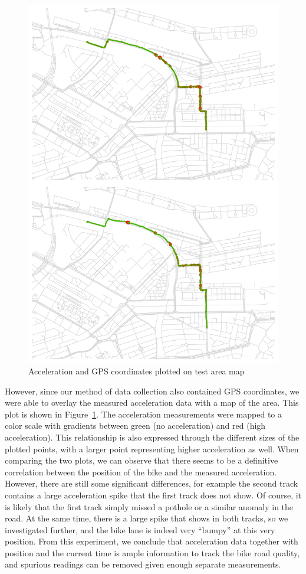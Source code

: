 \documentclass[a4paper,11pt]{article}
\begin{document}
\begin{figure}
\centering
\includegraphics[width=16cm]{figures/map}
\caption{Acceleration and GPS coordinates plotted on test area map}
\label{fig:map}
\end{figure}


However, since our method of data collection also contained GPS coordinates, we were able to overlay the measured acceleration data with a map of the area. This plot is shown in Figure~\ref{fig:map}. The acceleration measurements were mapped to a color scale with gradients between green (no acceleration) and red (high acceleration). This relationship is also expressed through the different sizes of the plotted points, with a larger point representing higher acceleration as well. When comparing the two plots, we can observe that there seems to be a definitive correlation between the position of the bike and the measured acceleration. However, there are still some significant differences, for example the second track contains a large acceleration spike that the first track does not show. Of course, it is likely that the first track simply missed a pothole or a similar anomaly in the road. At the same time, there is a large spike that shows in both tracks, so we investigated further, and the bike lane is indeed very ``bumpy'' at this very position. From this experiment, we conclude that acceleration data together with position and the current time is ample information to track the bike road quality, and spurious readings can be removed given enough separate measurements.
\end{document}
